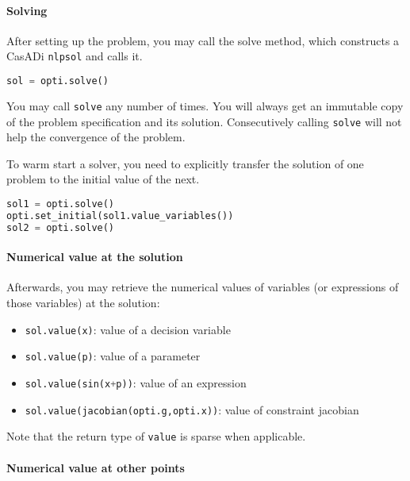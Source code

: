\documentclass[a4paper,12pt]{book}
\newcommand{\python}[1]{\lstinline[language=Python]{#1}}
\begin{document}
\paragraph{Solving}

After setting up the problem, you may call the solve method, which constructs a CasADi \python{nlpsol} and calls it.
\begin{lstlisting}[language=Python]
sol = opti.solve()
\end{lstlisting}

You may call \python{solve} any number of times. You will always get an immutable copy of the problem specification and its solution.
Consecutively calling \python{solve} will not help the convergence of the problem.

To warm start a solver, you need to explicitly transfer the solution of one problem to the initial value of the next.
\begin{lstlisting}[language=Python]
sol1 = opti.solve()
opti.set_initial(sol1.value_variables())
sol2 = opti.solve()
\end{lstlisting}

\paragraph{Numerical value at the solution}
Afterwards, you may retrieve the numerical values of variables (or expressions of those variables) at the solution:

\begin{itemize}
  \item[] \python{sol.value(x)}: value of a decision variable
  \item[] \python{sol.value(p)}: value of a parameter
  \item[] \python{sol.value(sin(x+p))}: value of an expression
  \item[] \python{sol.value(jacobian(opti.g,opti.x))}: value of constraint jacobian
\end{itemize}

Note that the return type of \python{value} is sparse when applicable.

\paragraph{Numerical value at other points}
\end{document}
